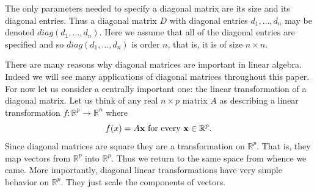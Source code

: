 \documentclass{book}
\begin{document}

The only parameters needed to specify a diagonal matrix are its size and its diagonal entries. Thus a diagonal matrix $D$ with diagonal entries $d_1,\ldots,d_n$ may be denoted $diag(d_1,\ldots,d_n)$. Here we assume that all of the diagonal entries are specified and so $diag(d_1,\ldots,d_n)$ is order $n$, that is, it is of size $n \times n$. 


There are many reasons why diagonal matrices are important in linear algebra. Indeed we will see many applications of diagonal matrices throughout this paper. For now let us consider a centrally important one: the linear transformation of a diagonal matrix. Let us  think of any real $n \times p$ matrix $A$ as describing a linear transformation $f:\mathbb{R}^p\rightarrow \mathbb{R}^n$ where 
$$
f(x) = A{\bf x} \text{ for every } {\bf x} \in \mathbb{R}^p.
$$
Since diagonal matrices are square they are a transformation on $\mathbb{R}^p$. That is, they map vectors from $\mathbb{R}^p$ into $\mathbb{R}^p$. Thus we return to the same space from whence we came. More importantly, diagonal linear transformations have very simple behavior on $\mathbb{R}^p$. They just scale the components of vectors.
\end{document}
